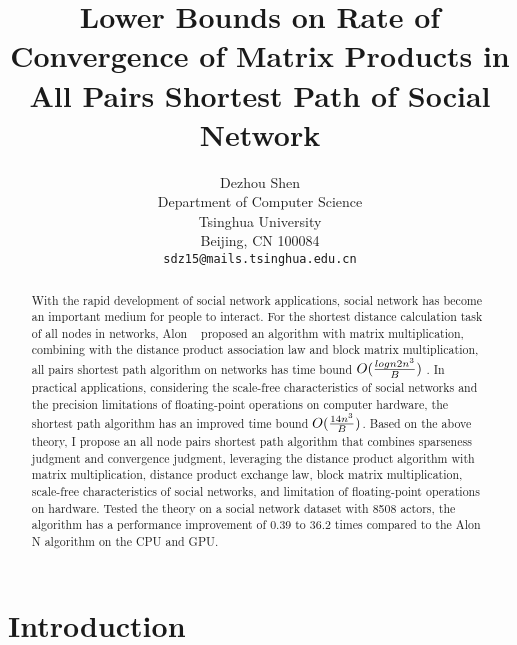 \documentclass[review]{cvpr}
\begin{document}
\title{Lower Bounds on Rate of Convergence of Matrix Products in All Pairs Shortest Path of Social Network}

\author{Dezhou Shen\\
Department of Computer Science\\
Tsinghua University\\
Beijing, CN 100084\\
{\tt\small sdz15@mails.tsinghua.edu.cn}
}

\maketitle


\begin{abstract}
  With the rapid development of social network applications, social network has become an important medium for people to interact.
  For the shortest distance calculation task of all nodes in networks, Alon \etal ~\cite{alon1997exponent} proposed an algorithm with matrix multiplication,
  combining with the distance product association law and block matrix multiplication, all pairs shortest path algorithm on networks has time bound \(O({logn2n^3 \over B})\) .
  In practical applications, considering the scale-free characteristics of social networks and the precision limitations of floating-point operations on computer hardware,
  the shortest path algorithm has an improved time bound \(O({14n^3 \over B})\). Based on the above theory, I propose an all node pairs shortest path algorithm that combines sparseness judgment and convergence judgment,
  leveraging the distance product algorithm with matrix multiplication, distance product exchange law, block matrix multiplication, scale-free characteristics of social networks,
  and limitation of floating-point operations on hardware. Tested the theory on a social network dataset with 8508 actors, the algorithm has a performance improvement of 0.39 to 36.2 times compared to the Alon N algorithm on the CPU and GPU.
\end{abstract}

\section{Introduction}
\end{document}
